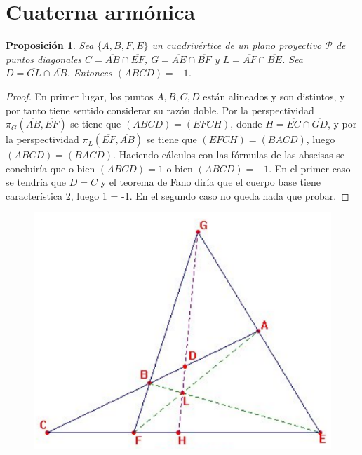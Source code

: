 \documentclass[12pt]{report}
\newtheorem{proposition}{Proposición}[chapter]
\theoremstyle{definition}
\theoremstyle{definition}
\theoremstyle{remark}
\begin{document}
\section{Cuaterna armónica}

\begin{proposition}
Sea $\{A,B,F,E\}$ un cuadrivértice de un plano proyectivo $\mathcal{P}$ de puntos diagonales $C = \overline{AB} \cap \overline{EF}$, $G = \overline{AE} \cap \overline{BF}$ y $L = \overline{AF} \cap \overline{BE}$. Sea $D = \overline{GL} \cap \overline{AB}$. Entonces $(ABCD) = -1$.
\end{proposition}

\begin{proof}
En primer lugar, los puntos $A,B,C,D$ están alineados y son distintos, y por tanto tiene sentido considerar su razón doble. Por la perspectividad $\pi_G(\overline{AB}, \overline{EF})$ se tiene que $(ABCD)=(EFCH)$, donde $H = \overline{EC} \cap \overline{GD}$, y por la perspectividad $\pi_L(\overline{EF}, \overline{AB})$ se tiene que $(EFCH)=(BACD)$, luego $(ABCD) = (BACD)$. Haciendo cálculos con las fórmulas de las abscisas se concluiría que o bien $(ABCD) = 1$ o bien $(ABCD) = -1$. En el primer caso se tendría que $D = C$ y el teorema de Fano diría que el cuerpo base tiene característica 2, luego 1 = -1. En el segundo caso no queda nada que probar.
\end{proof}

\begin{figure}[h]
\includegraphics[scale = 0.5]{2.9_1}
\centering
\end{figure}
\end{document}
